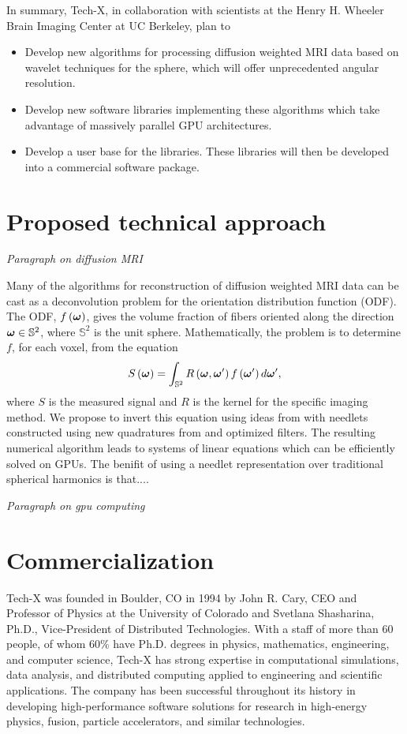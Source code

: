 \documentclass[10pt]{article}
\begin{document}
In summary, Tech-X, in collaboration with scientists at the Henry H. Wheeler Brain Imaging Center at UC Berkeley, plan to 
\begin{itemize}
  \item{Develop new algorithms for processing diffusion weighted MRI data based on wavelet techniques for the sphere, which will offer unprecedented angular resolution.}
  \item{Develop new software libraries implementing these algorithms which take advantage of massively parallel GPU architectures.}
  \item{Develop a user base for the libraries. These libraries will then be developed into a commercial software package.}
\end{itemize}

\section*{Proposed technical approach}
\emph{Paragraph on diffusion MRI}

Many of the algorithms for reconstruction of diffusion weighted MRI data can be cast as a deconvolution problem for the orientation distribution function (ODF)\cite{JIA-VEM-2007}. The ODF, $f\left({\boldsymbol{\omega}}\right)$, gives the volume fraction of fibers oriented along the direction ${\boldsymbol{\omega}}\in\mathbb{S}^2$, where $\mathbb{S}^2$ is the unit sphere. Mathematically, the problem is to determine $f$, for each voxel, from the equation
\begin{equation*}
  S\left({\boldsymbol{\omega}}\right) = \int_{\mathbb{S}^2} R\left({\boldsymbol{\omega}},{\boldsymbol{\omega}}'\right) f\left({\boldsymbol{\omega}}'\right)d{\boldsymbol{\omega}}',
\end{equation*}  
where $S$ is the measured signal and $R$ is the kernel for the specific imaging method. We propose to invert this equation using ideas from \cite{KE-NG-PI-2009} with needlets constructed using new quadratures from \cite{AHR-BEY-2009} and optimized filters. The resulting numerical algorithm leads to systems of linear equations which can be efficiently solved on GPUs. The benifit of using a needlet representation over traditional spherical harmonics is that....

\emph{Paragraph on gpu computing}

\section*{Commercialization}
Tech-X was founded in Boulder, CO in 1994 by John R. Cary, CEO and Professor of Physics at the University of Colorado and Svetlana Shasharina, Ph.D., Vice-President of Distributed Technologies. With a staff of more than 60 people, of whom 60\% have Ph.D. degrees in physics, mathematics, engineering, and computer science, Tech-X has strong expertise in computational simulations, data analysis, and distributed computing applied to engineering and scientific applications.  The company has been successful throughout its history in developing high-performance software solutions for research in high-energy physics, fusion, particle accelerators, and similar technologies.
\end{document}
